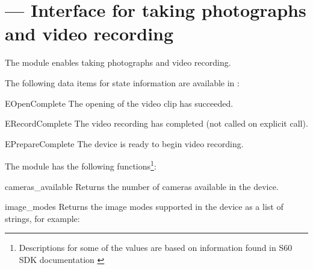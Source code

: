 %
%
%

\section{ ---
    Interface for taking photographs and video recording}

\label{sec:camera}

The  module enables taking photographs and video recording.

The following data items for state information are available in :

\begin{datadesc}{EOpenComplete}
The opening of the video clip has succeeded.
\end{datadesc}

\begin{datadesc}{ERecordComplete}
The video recording has completed (not called on explicit  
call).
\end{datadesc}

\begin{datadesc}{EPrepareComplete}
The device is ready to begin video recording.
\end{datadesc}

The  module has the following functions\footnote{Descriptions 
for some of the values are based on information found in S60 SDK documentation 
\cite{S60Doc}}:

\begin{funcdesc}{cameras_available}{}
Returns the number of cameras available in the device.
\end{funcdesc}

\begin{funcdesc}{image_modes}{}
Returns the image modes supported in the device as a list of strings, for 
example: 
\end{funcdesc}

